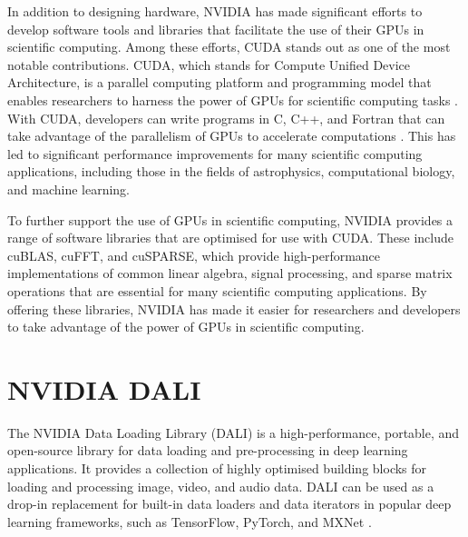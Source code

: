 \documentclass[licencjacka,en]{pracamgr}
\begin{document}
In addition to designing hardware, NVIDIA has made significant efforts to develop software tools and libraries that facilitate the use of their GPUs in scientific computing. Among these efforts, CUDA stands out as one of the most notable contributions. CUDA, which stands for Compute Unified Device Architecture, is a parallel computing platform and programming model that enables researchers to harness the power of GPUs for scientific computing tasks \cite{cuda-about}. With CUDA, developers can write programs in C, C++, and Fortran that can take advantage of the parallelism of GPUs to accelerate computations \cite{cuda-toolkit-official}. This has led to significant performance improvements for many scientific computing applications, including those in the fields of astrophysics, computational biology, and machine learning. 

To further support the use of GPUs in scientific computing, NVIDIA provides a range of software libraries that are optimised for use with CUDA. These include cuBLAS, cuFFT, and cuSPARSE, which provide high-performance implementations of common linear algebra, signal processing, and sparse matrix operations that are essential for many scientific computing applications\cite{nvidia-math-libs}. By offering these libraries, NVIDIA has made it easier for researchers and developers to take advantage of the power of GPUs in scientific computing.



\section{NVIDIA DALI}

The NVIDIA Data Loading Library (DALI) is a high-performance, portable, and open-source library for data loading and pre-processing in deep learning applications. It provides a collection of highly optimised building blocks for loading and processing image, video, and audio data. DALI can be used as a drop-in replacement for built-in data loaders and data iterators in popular deep learning frameworks, such as TensorFlow, PyTorch, and MXNet \cite{dali-docs}. \\
\\
\end{document}
